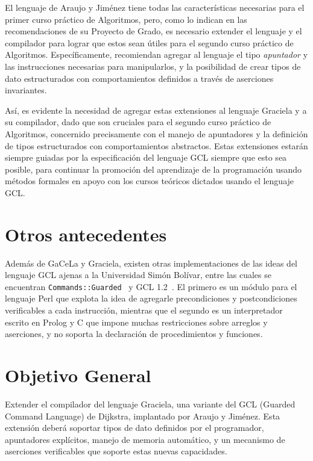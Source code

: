 El lenguaje de Araujo y Jiménez tiene todas las características necesarias para
el primer curso práctico de Algoritmos, pero, como lo indican en las
recomendaciones de su Proyecto de Grado, es necesario extender el lenguaje y el
compilador para lograr que estos sean útiles para el segundo curso práctico de
Algoritmos. Específicamente, recomiendan agregar al lenguaje el tipo
\textit{apuntador} y las instrucciones necesarias para manipularlos, y la
posibilidad de crear tipos de dato estructurados con comportamientos definidos
a través de aserciones invariantes.

Así, es evidente la necesidad de agregar estas extensiones al lenguaje Graciela
y a su compilador, dado que son cruciales para el segundo curso práctico de
Algoritmos, concernido precisamente con el manejo de apuntadores y la definición
de tipos estructurados con comportamientos abstractos. Estas extensiones estarán
siempre guiadas por la especificación del lenguaje GCL siempre que esto sea
posible, para continuar la promoción del aprendizaje de la programación usando
métodos formales en apoyo con los cursos teóricos dictados usando el lenguaje
GCL.

\section*{Otros antecedentes}

Además de GaCeLa y Graciela, existen otras implementaciones de las ideas del
lenguaje GCL ajenas a la Universidad Simón Bolívar, entre las cuales se
encuentran  \texttt{Commands::Guarded}~\cite{perlguarded} y GCL
1.2~\cite{gclonetwo}. El primero es un módulo para el lenguaje Perl que explota
la idea de agregarle precondiciones y postcondiciones verificables a cada
instrucción, mientras que el segundo es un interpretador escrito en Prolog y C
que impone muchas restricciones sobre arreglos y aserciones, y no soporta la
declaración de procedimientos y funciones.

\section*{Objetivo General}

Extender el compilador del lenguaje Graciela, una variante del GCL (Guarded
Command Language) de Dijkstra, implantado por Araujo y Jiménez. Esta extensión
deberá soportar tipos de dato definidos por el programador, apuntadores
explícitos, manejo de memoria automático, y un mecanismo de aserciones
verificables que soporte estas nuevas capacidades.

